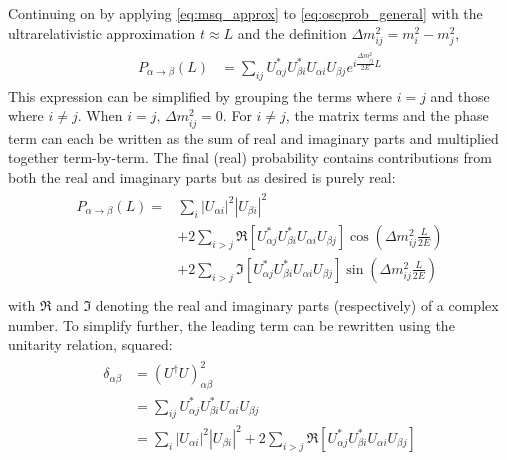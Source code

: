 Continuing on by applying \cref{eq:msq_approx} to \cref{eq:oscprob_general}
with the ultrarelativistic approximation $t \approx L$
and the definition $\Delta m^2_{ij} = m_i^2 - m_j^2$,
\begin{align}\label{eq:oscprob_general_2}
    \begin{split}
        P_{\alpha\to\beta}(L)
        &= \sum_{ij} U^*_{\alpha j} U^*_{\beta i} U_{\alpha i} U_{\beta j}
        e^{i\frac{\Delta m^2_{ij}}{2E}L}
    \end{split}
\end{align}
This expression can be simplified by grouping the terms where $i=j$
and those where $i\neq j$.
When $i=j$, $\Delta m^2_{ij} = 0$.
For $i\neq j$, the matrix terms and the phase term can each be written
as the sum of real and imaginary parts and multiplied together term-by-term.
The final (real) probability contains contributions from both
the real and imaginary parts but as desired is purely real:
\begin{align}\label{eq:oscprob_general_3}
    \begin{split}
        P_{\alpha\to\beta}(L) =
        & \sum_i \left|U_{\alpha i}\right|^2 \left|U_{\beta i}\right|^2 \\
        & + 2\sum_{i>j} \Re \left[
            U^*_{\alpha j} U^*_{\beta i} U_{\alpha i} U_{\beta j}
        \right]
        \cos\left(\Delta m^2_{ij}\frac{L}{2E}\right) \\
        & + 2\sum_{i>j} \Im \left[
            U^*_{\alpha j} U^*_{\beta i} U_{\alpha i} U_{\beta j}
        \right]
        \sin\left(\Delta m^2_{ij}\frac{L}{2E}\right) \\
    \end{split}
\end{align}
with $\Re$ and $\Im$ denoting the real and imaginary parts (respectively)
of a complex number.
To simplify further, the leading term can be rewritten
using the unitarity relation, squared:
\begin{align}\label{eq:sub_unitarity}
    \begin{split}
        \delta_{\alpha\beta}
        &= (U^\dagger U)^2_{\alpha\beta} \\
        &= \sum_{ij} U^*_{\alpha j} U^*_{\beta i} U_{\alpha i} U_{\beta j} \\
        &= \sum_i \left|U_{\alpha i}\right|^2 \left|U_{\beta i}\right|^2
        + 2\sum_{i>j} \Re \left[
            U^*_{\alpha j} U^*_{\beta i} U_{\alpha i} U_{\beta j}
        \right]
    \end{split}
\end{align}
